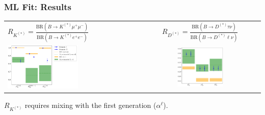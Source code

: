 \documentclass[mathserif, 10pt]{beamer}
\begin{document}
\begin{frame}\frametitle{ML Fit: Results}

    \begin{center}
        \begin{tabular}{lc}
            $R_{K^{(*)}} = \frac{\mathrm{BR}(B\to K^{(*)}\mu^+ \mu^-)}{\mathrm{BR}(B\to K^{(*)}e^+ e^-)}$ & $R_{D^{(*)}} = \frac{\mathrm{BR}(B\to D^{(*)}\tau \nu)}{\mathrm{BR}(B\to D^{(*)}\ell \nu)}$ \\
            \includegraphics[width=0.55\textwidth]{figures/rotRKplot.pdf}                                 &
            \includegraphics[width=0.4\textwidth]{figures/rotRDplot.pdf}
        \end{tabular}
    \end{center}
    $R_{K^{(*)}}$ requires mixing with the first generation ($\alpha^\ell$).
\end{frame}
\end{document}
